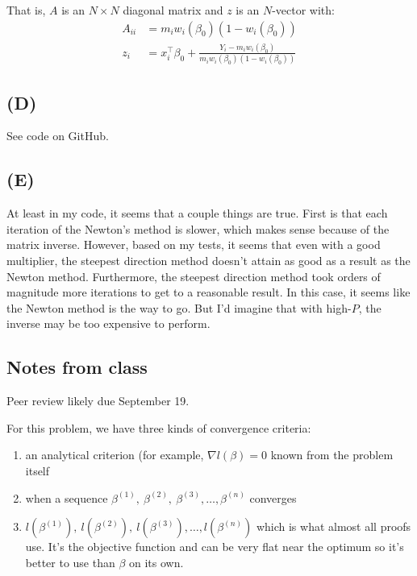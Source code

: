 \documentclass{article}
\begin{document}
That is, $A$ is an $N\times N$ diagonal matrix and $z$ is an $N$-vector with:
\begin{align*}
A_{ii}&=m_i w_i(\beta_0) (1-w_i(\beta_0))\\
z_i&=x_i^\top\beta_0+\frac{Y_i-m_i w_i(\beta_0)}{m_i w_i(\beta_0) (1-w_i(\beta_0))}
\end{align*}


\subsection{(D)}
See code on GitHub.

\subsection{(E)}
At least in my code, it seems that a couple things are true. First is that each iteration of the Newton's method is slower,
which makes sense because of the matrix inverse. However, based on my tests, it seems that even with a good multiplier, the steepest direction method doesn't attain as good as a result as the Newton method. Furthermore, the
steepest direction method took orders of magnitude more iterations to get to a reasonable result. In this case, it seems
like the Newton method is the way to go. But I'd imagine that with high-$P$, the inverse may be too expensive to perform.

\subsection{Notes from class}
Peer review likely due September 19.

For this problem, we have three kinds of convergence criteria:
\begin{enumerate}[1.]
\item an analytical criterion (for example, $\nabla l(\beta)=0$ known from the problem itself
\item when a sequence $\beta^{(1)},~\beta^{(2)},~\beta^{(3)},\ldots,\beta^{(n)}$ converges
\item $l(\beta^{(1)}),~l(\beta^{(2)}),~l(\beta^{(3)}),\ldots,l(\beta^{(n)})$ which is what almost all proofs use. It's the objective function and can be very flat near the optimum so it's better to use than $\beta$ on its own.
\end{enumerate}
\end{document}
